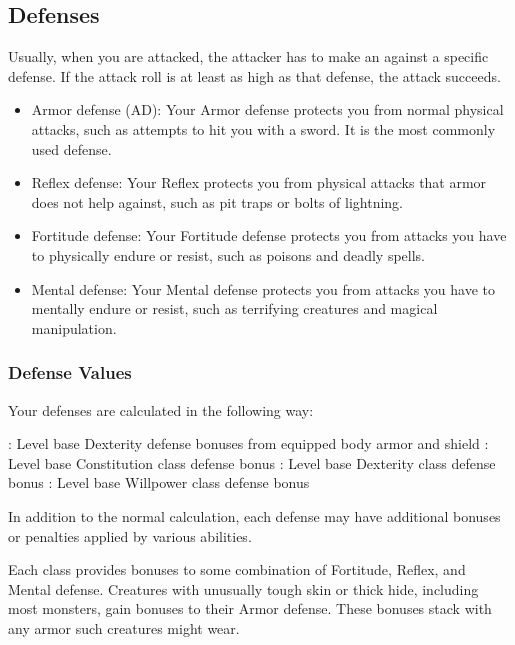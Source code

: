     \subsection{Defenses}\label{Defenses}
        Usually, when you are attacked, the attacker has to make an  against a specific defense.
        If the attack roll is at least as high as that defense, the attack succeeds.
        \begin{itemize}
            \item Armor defense (AD): Your Armor defense protects you from normal physical attacks, such as attempts to hit you with a sword.
                It is the most commonly used defense.
            \item Reflex defense: Your Reflex protects you from physical attacks that armor does not help against, such as pit traps or bolts of lightning.
            \item Fortitude defense: Your Fortitude defense protects you from attacks you have to physically endure or resist, such as poisons and deadly spells.
            \item Mental defense: Your Mental defense protects you from attacks you have to mentally endure or resist, such as terrifying creatures and magical manipulation.
        \end{itemize}

        \subsubsection{Defense Values}\label{Defense Values}

            Your defenses are calculated in the following way:
            \begin{itemize}
                : Level \add base Dexterity \add defense bonuses from equipped body armor and shield
                : Level \add base Constitution \add class defense bonus
                : Level \add base Dexterity \add class defense bonus
                : Level \add base Willpower \add class defense bonus
            \end{itemize}
            In addition to the normal calculation, each defense may have additional bonuses or penalties applied by various abilities.

             Each class provides bonuses to some combination of Fortitude, Reflex, and Mental defense.
             Creatures with unusually tough skin or thick hide, including most monsters, gain bonuses to their Armor defense.
            These bonuses stack with any armor such creatures might wear.

